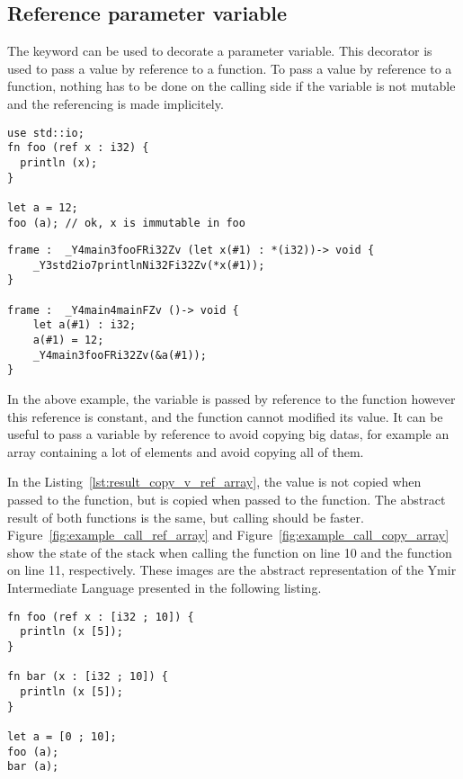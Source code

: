 

\subsection{Reference parameter variable}
\label{sec:ref_param}

The  keyword can be used to decorate a parameter variable. This
decorator is used to pass a value by reference to a function. To pass a value by
reference to a function, nothing has to be done on the calling side if the
variable is not mutable and the referencing is made implicitely.

\begin{lstlisting}[style=coloredverbatim]
use std::io;
fn foo (ref x : i32) {
  println (x);
}

let a = 12;
foo (a); // ok, x is immutable in foo
\end{lstlisting}

\begin{lstlisting}[style=intermediateVerb]
frame :  _Y4main3fooFRi32Zv (let x(#1) : *(i32))-> void {
    _Y3std2io7printlnNi32Fi32Zv(*x(#1));
}

frame :  _Y4main4mainFZv ()-> void {
    let a(#1) : i32;
    a(#1) = 12;
    _Y4main3fooFRi32Zv(&a(#1));
}
\end{lstlisting}

In the above example, the variable  is passed by reference to the
function  however this reference is constant, and the function
 cannot modified its value. It can be useful to pass a variable by
reference to avoid copying big datas, for example an array containing a lot of
elements and avoid copying all of them.



In the Listing~\ref{lst:result_copy_v_ref_array}, the value is not copied when passed to the 
function, but is copied when passed to the  function. The abstract
result of both functions is the same, but calling  should be faster.
Figure~\ref{fig:example_call_ref_array} and
Figure~\ref{fig:example_call_copy_array} show the state of the stack when
calling the  function on line 10 and the  function on
line 11, respectively. These images are the abstract representation of the Ymir
Intermediate Language presented in the following listing.

\begin{lstlisting}[style=coloredverbatim, label=lst:result_copy_v_ref_array, caption=Example of passing an array by reference vs. by value]
fn foo (ref x : [i32 ; 10]) {
  println (x [5]);
}

fn bar (x : [i32 ; 10]) {
  println (x [5]);
}

let a = [0 ; 10];
foo (a);
bar (a);
\end{lstlisting}


